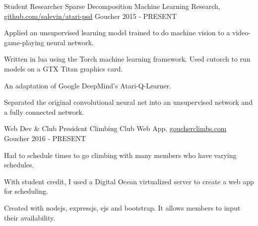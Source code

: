 

\begin{cventries}

  \cventry
    {Student Researcher} %
    {Sparse Decomposition Machine Learning Research{\normalfont, \href{https://github.com/salevin/atari-psd}{github.com/salevin/atari-psd}}} %
    {Goucher} %
    {2015 - PRESENT} %
    {
      \begin{cvitems} %
        \item {Applied an unsupervised learning model trained to do machine vision to a video-game-playing neural network.}
        \item {Written in lua using the Torch machine learning framework. Used cutorch to run models on a GTX Titan graphics card.}
        \item {An adaptation of Google DeepMind's Atari-Q-Learner}.
        \item {Separated the original convolutional neural net into an unsupervised network and a fully connected network.}
      \end{cvitems}
    }

  \cventry
    {Web Dev \& Club President} %
    {Climbing Club Web App{\normalfont, \href{http://www.goucherclimbs.com/}{goucherclimbs.com}} } %
    {Goucher} %
    {2016 - PRESENT} %
    {
      \begin{cvitems} %
        \item {Had to schedule times to go climbing with many members who have varying schedules.}
        \item {With student credit, I used a Digital Ocean virtualized server to create a web app for scheduling.}
        \item {Created with nodejs, expressjs, ejs and bootstrap. It allows members to input their availability.}
      \end{cvitems}
    }

\end{cventries}
